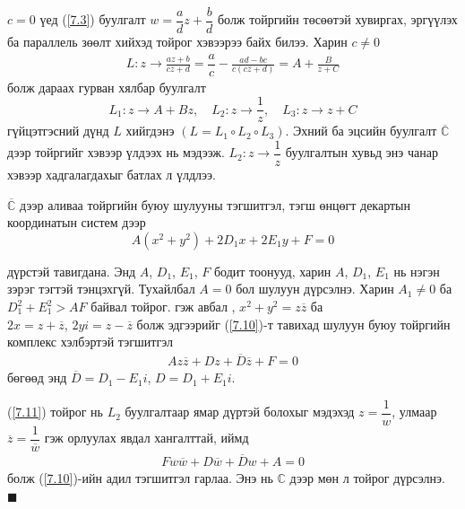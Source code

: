 \begin{prf}
$c=0$ үед (\ref{7.3}) буулгалт $w=\dfrac{a}{d}z+\dfrac{b}{d}$ болж тойргийн төсөөтэй хувиргах, эргүүлэх ба параллель зөөлт хийхэд тойрог хэвээрээ байх билээ. Харин $c\neq 0$ 
\begin{eqnarray}
L:z\rightarrow \frac{az+b}{cz+d}=\dfrac{a}{c}-\frac{ad-bc}{c(cz+d)}=A+\frac{B}{z+C}
\end{eqnarray}
болж дараах гурван хялбар буулгалт
$$L_1:z\rightarrow A+Bz, \quad L_2:z\rightarrow \frac{1}{z}, \quad L_3:z\rightarrow z+C$$
гүйцэтгэсний дүнд $L$ хийгдэнэ $(L=L_1\circ L_2\circ L_3)$. Эхний ба эцсийн буулгалт $\overline{\mathbb{C}}$ дээр тойргийг хэвээр үлдээх нь мэдээж. $L_2:z\rightarrow \dfrac{1}{z}$ буулгалтын хувьд энэ чанар хэвээр хадгалагдахыг батлах л үлдлээ.

$\overline{\mathbb{C}}$ дээр аливаа тойргийн буюу шулууны тэгшитгэл, тэгш өнцөгт декартын координатын систем дээр 
\begin{equation} \label{7.10}
 A(x^2+y^2)+2D_1x+2E_1y+F=0   
\end{equation} 

дүрстэй тавигдана. Энд $A$, $D_1$, $E_1$, $F$ бодит тоонууд, харин $A$, $D_1$, $E_1$ нь нэгэн зэрэг тэгтэй тэнцэхгүй. Тухайлбал $A=0$ бол шулуун дүрсэлнэ. Харин $A_1\neq 0$ ба  $D_1^2+E_1^2>AF$ байвал тойрог. \z  гэж авбал \hz, $x^2+y^2=z\overline{z}$ ба \\ $2x=z+\overline{z}$, $2yi=z-\overline{z}$ болж эдгээрийг (\ref{7.10})-т тавихад шулуун буюу тойргийн комплекс хэлбэртэй
тэгшитгэл
\begin{eqnarray} \label{7.11}
Az\overline{z}+Dz+\overline{D}\overline{z}+F=0
\end{eqnarray}
бөгөөд энд $\overline{D}=D_1-E_1i$, $D=D_1+E_1 i.$

(\ref{7.11}) тойрог нь $L_2$ буулгалтаар ямар дүртэй болохыг мэдэхэд $z=\dfrac{1}{w}$, улмаар $\overline{z}=\dfrac{1}{\overline{w}}$ гэж орлуулах явдал хангалттай, иймд
\begin{eqnarray}
Fw\overline{w}+D\overline{w}+\overline{D}w+A=0
\end{eqnarray}
болж (\ref{7.10})-ийн адил тэгшитгэл гарлаа. Энэ нь $\mathbb{C}$ дээр мөн л тойрог дүрсэлнэ. 
\hfill $\blacksquare$\end{prf}

